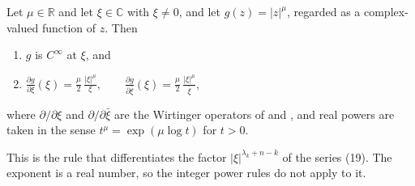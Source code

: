 \begin{lemma}
Let $\mu\in\mathbb{R}$ and let $\xi\in\mathbb{C}$ with $\xi\neq0$, and let
$g(z)=|z|^{\mu}$, regarded as a complex-valued function of $z$.  Then
\begin{enumerate}
\item[(a)] $g$ is $C^\infty$ at $\xi$, and
\item[(b)] $\displaystyle
  \frac{\partial g}{\partial\xi}(\xi)=\frac{\mu}{2}\,\frac{|\xi|^{\mu}}{\xi},
  \qquad
  \frac{\partial g}{\partial\bar\xi}(\xi)
    =\frac{\mu}{2}\,\frac{|\xi|^{\mu}}{\bar\xi},$
\end{enumerate}
where $\partial/\partial\xi$ and $\partial/\partial\bar\xi$ are the Wirtinger
operators of  and , and real powers are taken in the
sense $t^{\mu}=\exp(\mu\log t)$ for $t>0$.

This is the rule that differentiates the factor $|\xi|^{\lambda_k+n-k}$ of the
series (19).  The exponent is a real number, so the integer power rules do not
apply to it.
\end{lemma}
